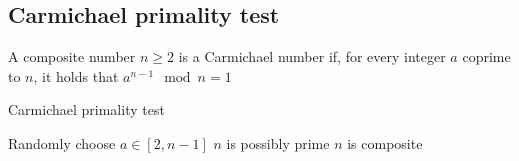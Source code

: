 \subsection{Carmichael primality test}
\begin{definition}
    A composite number $n\geq 2$ is a Carmichael number if, for every integer $a$ coprime to $n$, it holds that $a^{n-1} \mod n = 1$
\end{definition}
\begin{algorithm}[H]
    \caption{Carmichael primality test}
    \begin{algorithmic}[1]
        \State Randomly choose $a\in[2,n-1]$
            \State $n$ is possibly prime 
        \Else 
            \State $n$ is composite
        \EndIf
    \end{algorithmic}
\end{algorithm} 


